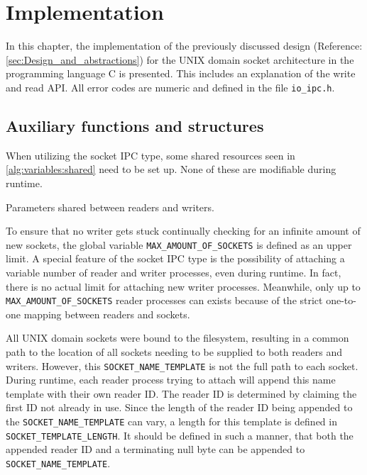 %
%

\chapter{Implementation}
\label{cha:implementation}
In this chapter, the implementation of the previously discussed design (Reference\@: \ref{sec:Design_and_abstractions}) for the UNIX domain socket architecture in the programming language C is presented.
This includes an explanation of the write and read \ac{API}.
All error codes are numeric and defined in the file \texttt{io\_ipc.h}.

\section{Auxiliary functions and structures}
When utilizing the socket \ac{IPC} type, some shared resources seen in \ref{alg:variables:shared} need to be set up.
None of these are modifiable during runtime.

\begin{algorithm}[h!]
    
    \caption[Socket: Shared variables]{Parameters shared between readers and writers.}
    \label{alg:variables:shared}
\end{algorithm}

To ensure that no writer gets stuck continually checking for an infinite amount of new sockets, the global variable \texttt{MAX\_AMOUNT\_OF\_SOCKETS} is defined as an upper limit.
A special feature of the socket \ac{IPC} type is the possibility of attaching a variable number of reader and writer processes, even during runtime.
In fact, there is no actual limit for attaching new writer processes.
Meanwhile, only up to \texttt{MAX\_AMOUNT\_OF\_SOCKETS} reader processes can exists because of the strict one-to-one mapping between readers and sockets. 

All UNIX domain sockets were bound to the filesystem, resulting in a common path to the location of all sockets needing to be supplied to both readers and writers.
However, this \texttt{SOCKET\_NAME\_TEMPLATE} is not the full path to each socket.
During runtime, each reader process trying to attach will append this name template with their own reader \ac{ID}.
The reader \ac{ID} is determined by claiming the first \ac{ID} not already in use.
Since the length of the reader \ac{ID} being appended to the \texttt{SOCKET\_NAME\_TEMPLATE} can vary, a length for this template is defined in \texttt{SOCKET\_TEMPLATE\_LENGTH}.
It should be defined in such a manner, that both the appended reader \ac{ID} and a terminating null byte can be appended to \texttt{SOCKET\_NAME\_TEMPLATE}.

